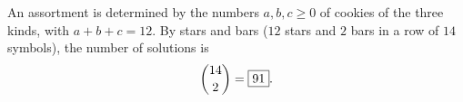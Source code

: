 An assortment is determined by the numbers $a,b,c\ge0$ of cookies of the three kinds, with $a+b+c=12$. By stars and bars ($12$ stars and $2$ bars in a row of $14$ symbols), the number of solutions is
\[
\dbinom{14}{2}=\boxed{91}.
\]
